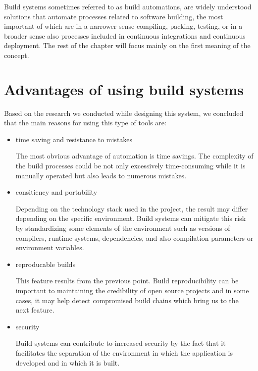 Build systems sometimes referred to as build automations, are widely
understood solutions that automate processes related to software
building, the most important of which are in a narrower sense compiling,
packing, testing, or in a broader sense also processes included in
continuous integrations and continuous deployment. The rest of the
chapter will focus mainly on the first meaning of the concept.

\hypertarget{advantages-of-using-build-systems}{%
\section{Advantages of using build
systems}\label{advantages-of-using-build-systems}}

Based on the research we conducted while designing this system,
we concluded that the main reasons for using this
type of tools are:

\begin{itemize}
\item
  time saving and resistance to mistakes

The most obvious advantage of automation is time savings. The complexity
of the build processes could be not only excessively time-consuming
while it is manually operated but also leads to numerous mistakes.
\end{itemize}


\begin{itemize}
\item
  consitiency and portability

Depending on the technology stack used in the project, the result may
differ depending on the specific environment. Build systems can mitigate
this risk by standardizing some elements of the environment such as
versions of compilers, runtime systems, dependencies, and also
compilation parameters or environment variables.
\end{itemize}


\begin{itemize}
\item
  reproducable builds

This feature results from the previous point. Build reproducibility can
be important to maintaining the credibility of open source projects and
in some cases, it may help detect compromised build chains which bring us
to the next feature.
\end{itemize}


\begin{itemize}
\item
  security

Build systems can contribute to increased security by the fact that it
facilitates the separation of the environment in which the application
is developed and in which it is built.
\end{itemize}


